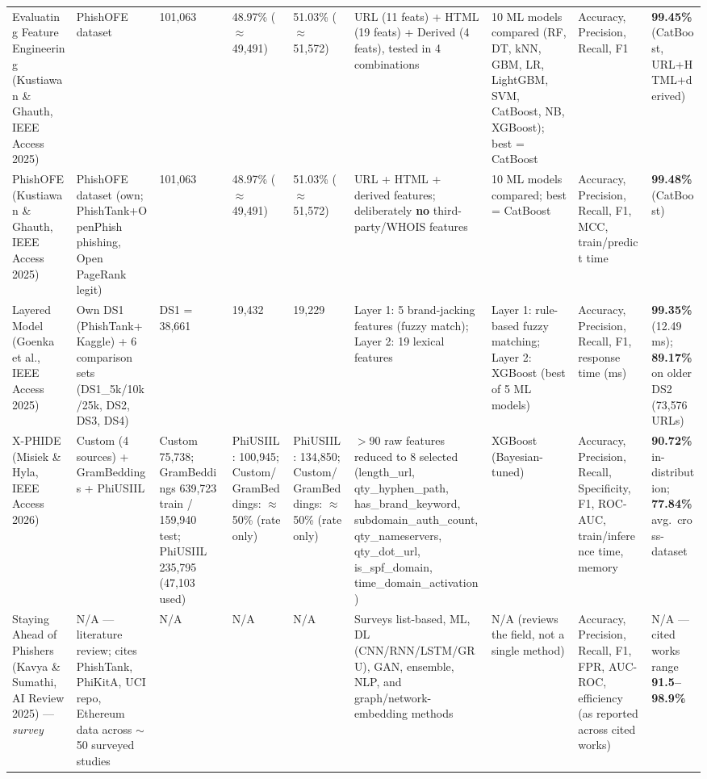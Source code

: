 \documentclass[10pt]{article}
\begin{document}
\begin{longtable}{L{2.6cm} L{2.6cm} L{1.8cm} L{2.7cm} L{2.7cm} L{4.4cm} L{3.4cm} L{2.6cm} L{3.0cm}}
Evaluating Feature Engineering (Kustiawan \& Ghauth, IEEE Access 2025)
 & PhishOFE dataset
 & 101{,}063
 & 48.97\% ($\approx$49{,}491)
 & 51.03\% ($\approx$51{,}572)
 & URL (11 feats) + HTML (19 feats) + Derived (4 feats), tested in 4 combinations
 & 10 ML models compared (RF, DT, kNN, GBM, LR, LightGBM, SVM, CatBoost, NB, XGBoost); best = CatBoost
 & Accuracy, Precision, Recall, F1
 & \textbf{99.45\%} (CatBoost, URL+HTML+derived) \\

PhishOFE (Kustiawan \& Ghauth, IEEE Access 2025)
 & PhishOFE dataset (own; PhishTank+OpenPhish phishing, Open PageRank legit)
 & 101{,}063
 & 48.97\% ($\approx$49{,}491)
 & 51.03\% ($\approx$51{,}572)
 & URL + HTML + derived features; deliberately \textbf{no} third-party/WHOIS features
 & 10 ML models compared; best = CatBoost
 & Accuracy, Precision, Recall, F1, MCC, train/predict time
 & \textbf{99.48\%} (CatBoost) \\

Layered Model (Goenka et al., IEEE Access 2025)
 & Own DS1 (PhishTank+Kaggle) + 6 comparison sets (DS1\_5k/10k/25k, DS2, DS3, DS4)
 & DS1 = 38{,}661
 & 19{,}432
 & 19{,}229
 & Layer 1: 5 brand-jacking features (fuzzy match); Layer 2: 19 lexical features
 & Layer 1: rule-based fuzzy matching; Layer 2: XGBoost (best of 5 ML models)
 & Accuracy, Precision, Recall, F1, response time (ms)
 & \textbf{99.35\%} (12.49 ms); \textbf{89.17\%} on older DS2 (73{,}576 URLs) \\

X-PHIDE (Misiek \& Hyla, IEEE Access 2026)
 & Custom (4 sources) + GramBeddings + PhiUSIIL
 & Custom 75{,}738; GramBeddings 639{,}723 train / 159{,}940 test; PhiUSIIL 235{,}795 (47{,}103 used)
 & PhiUSIIL: 100{,}945; Custom/GramBeddings: $\approx$50\% (rate only)
 & PhiUSIIL: 134{,}850; Custom/GramBeddings: $\approx$50\% (rate only)
 & $>$90 raw features reduced to 8 selected (length\_url, qty\_hyphen\_path, has\_brand\_keyword, subdomain\_auth\_count, qty\_nameservers, qty\_dot\_url, is\_spf\_domain, time\_domain\_activation)
 & XGBoost (Bayesian-tuned)
 & Accuracy, Precision, Recall, Specificity, F1, ROC-AUC, train/inference time, memory
 & \textbf{90.72\%} in-distribution; \textbf{77.84\%} avg.\ cross-dataset \\

Staying Ahead of Phishers (Kavya \& Sumathi, AI Review 2025) --- \textit{survey}
 & N/A --- literature review; cites PhishTank, PhiKitA, UCI repo, Ethereum data across $\sim$50 surveyed studies
 & N/A
 & N/A
 & N/A
 & Surveys list-based, ML, DL (CNN/RNN/LSTM/GRU), GAN, ensemble, NLP, and graph/network-embedding methods
 & N/A (reviews the field, not a single method)
 & Accuracy, Precision, Recall, F1, FPR, AUC-ROC, efficiency (as reported across cited works)
 & N/A --- cited works range \textbf{91.5--98.9\%} \\


\end{longtable}
\end{document}
